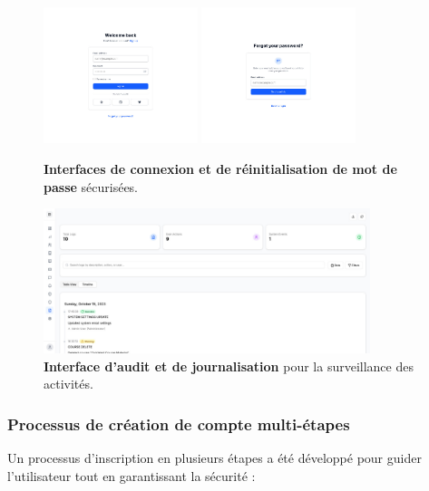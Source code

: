 \begin{figure}[H]
  \centering
  \includegraphics[width=0.4\textwidth,keepaspectratio]{old-reports/week_4_img/login.jpeg}
  \includegraphics[width=0.4\textwidth,keepaspectratio]{old-reports/week_4_img/reset.jpeg}
  \caption{\textbf{Interfaces de connexion et de réinitialisation de mot de passe} sécurisées.}
  \label{fig:auth_interfaces}
\end{figure}

\begin{figure}[H]
  \centering
  \includegraphics[width=0.85\textwidth,keepaspectratio]{old-reports/week_4_img/audit.jpeg}
  \caption{\textbf{Interface d'audit et de journalisation} pour la surveillance des activités.}
  \label{fig:audit_logs}
\end{figure}

\subsubsection{Processus de création de compte multi-étapes}

Un processus d'inscription en plusieurs étapes a été développé pour guider l'utilisateur tout en garantissant la sécurité :

